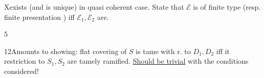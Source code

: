 X\qquad exists (and is unique) in quasi coherent case.
State that $\mathcal E$ is of finite type (resp. finite
presentation ) iff $\mathcal E_1,\mathcal E_2$ are.

5

12\quad Amounts to showing: 
 flat covering of $S$
is tame with r. to $D_1,D_2$ iff it 
restriction to $S_1,S_2$ are tamely ramified.
\uline{Should be trivial} with the conditions considered!

